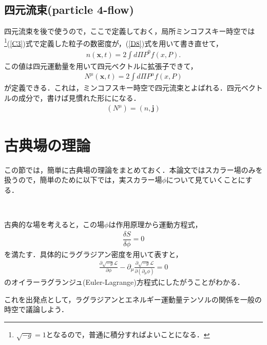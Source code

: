 \subsection{四元流束(particle 4-flow)}
四元流束を後で使うので，ここで定義しておく，局所ミンコフスキー時空では\footnote{$\sqrt{-g}=1$となるので，普通に積分すればよいことになる．}(\ref{C3})式で定義した粒子の数密度が，(\ref{D8})式を用いて書き直せて，
\begin{eqnarray}
n(\bm{x},t)=2\int d\Pi P^0f(x,P) .
\end{eqnarray}
この値は四元運動量を用いて四元ベクトルに拡張子できて，
\begin{eqnarray}
\label{D13}
N^{\mu}(\bm{x},t)=2\int d\Pi P^{\mu}f(x,P)
\end{eqnarray}
が定義できる．これは，ミンコフスキー時空で四元流束とよばれる．四元ベクトルの成分で，書けば見慣れた形にになる．
\begin{eqnarray}
(N^{\mu})=(n,\bm{j})
\end{eqnarray}

\section{古典場の理論}
この節では，簡単に古典場の理論をまとめておく．本論文ではスカラー場のみを扱うので，簡単のために以下では，実スカラー場$\phi$について見ていくことにする．
\begin{empheqboxed}
\

古典的な場を考えると，この場$\phi$は作用原理から運動方程式，
\begin{eqnarray}
\label{eleq}
\dfrac{\delta S}{\delta \phi}=0
\end{eqnarray}
を満たす．具体的にラグラジアン密度を用いて表すと，
\begin{eqnarray}
\label{EL}
\frac{\partial \sqrt{-g}\mathcal{L}}{\partial \phi}-
\partial_{\mu}\frac{\partial \sqrt{-g}\mathcal{L}}{\partial(\partial_{\mu} \phi)}=0
\end{eqnarray}
のオイラーラグランジュ(Euler-Lagrange)方程式にしたがうことがわかる．
\end{empheqboxed}
これを出発点として，ラグラジアンとエネルギー運動量テンソルの関係を一般の時空で議論しよう．


